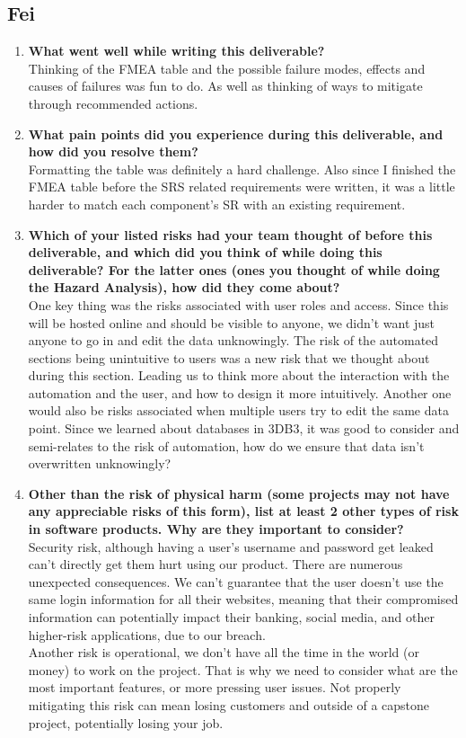 \documentclass{article}
\begin{document}
\subsection*{Fei}
\begin{enumerate}
    \item \textbf{What went well while writing this deliverable?}\\
    Thinking of the FMEA table and the possible failure modes, effects and causes of failures was fun to do. As well as thinking of ways to mitigate through recommended actions.
    \item \textbf{What pain points did you experience during this deliverable, and how
    did you resolve them?}\\
    Formatting the table was definitely a hard challenge. Also since I finished the FMEA table before the SRS related requirements were written, it was a little harder to match each component's SR with an existing requirement.
    \item \textbf{Which of your listed risks had your team thought of before this
    deliverable, and which did you think of while doing this deliverable? For
    the latter ones (ones you thought of while doing the Hazard Analysis), how
    did they come about?}\\
    One key thing was the risks associated with user roles and access. Since this will be hosted online and should be visible to anyone, we didn't want just anyone to go in and edit the data unknowingly. The risk of the automated sections being unintuitive to users was a new risk
    that we thought about during this section. Leading us to think more about the interaction with the automation and the user, and how to design it more intuitively. Another one would also be risks associated when multiple users try to edit the same data point.
    Since we learned about databases in 3DB3, it was good to consider and semi-relates to the risk of automation, how do we ensure that data isn't overwritten unknowingly?
    \item \textbf{Other than the risk of physical harm (some projects may not have any
    appreciable risks of this form), list at least 2 other types of risk in
    software products. Why are they important to consider?} \\
    Security risk, although having a user's username and password get leaked can't directly get them hurt using our product. There are numerous unexpected consequences. We can't guarantee that the user doesn't use the same login information for all their websites, meaning that their compromised information can potentially impact their banking, social media, and other higher-risk applications, due to our breach.\\
    Another risk is operational, we don't have all the time in the world (or money) to work on the project. That is why we need to consider what are the most important features, or more pressing user issues. Not properly mitigating this risk can mean losing customers and outside of a capstone project, potentially losing your job.
  \end{enumerate}
\end{document}
